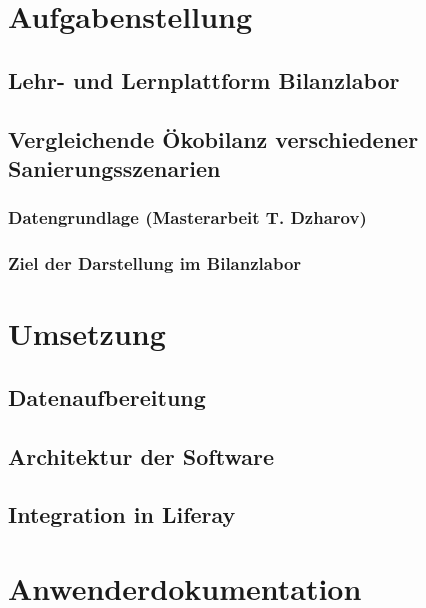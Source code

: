 
\chapter{Aufgabenstellung}

\section{Lehr- und Lernplattform Bilanzlabor}

\section{Vergleichende Ökobilanz verschiedener Sanierungsszenarien}

\subsection{Datengrundlage (Masterarbeit T. Dzharov)}
 
\subsection{Ziel der Darstellung im Bilanzlabor}

\chapter{Umsetzung}

\section{Datenaufbereitung}
\section{Architektur der Software}
\section{Integration in Liferay}

\chapter{Anwenderdokumentation}

